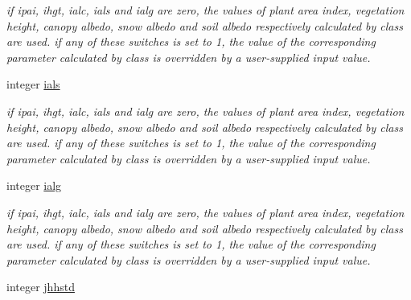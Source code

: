 \begin{DoxyCompactItemize}
\begin{DoxyCompactList}\small\item\em if ipai, ihgt, ialc, ials and ialg are zero, the values of plant area index, vegetation height, canopy albedo, snow albedo and soil albedo respectively calculated by class are used. if any of these switches is set to 1, the value of the corresponding parameter calculated by class is overridden by a user-\/supplied input value. \end{DoxyCompactList}\item 
\hypertarget{structctem__statevars_1_1ctem__switches_aff86913c530536a58810226dd8e6f61e}{}integer \hyperlink{structctem__statevars_1_1ctem__switches_aff86913c530536a58810226dd8e6f61e}{ials}\label{structctem__statevars_1_1ctem__switches_aff86913c530536a58810226dd8e6f61e}

\begin{DoxyCompactList}\small\item\em if ipai, ihgt, ialc, ials and ialg are zero, the values of plant area index, vegetation height, canopy albedo, snow albedo and soil albedo respectively calculated by class are used. if any of these switches is set to 1, the value of the corresponding parameter calculated by class is overridden by a user-\/supplied input value. \end{DoxyCompactList}\item 
\hypertarget{structctem__statevars_1_1ctem__switches_a85e5b15cebeef9dfacbba0ecca64380c}{}integer \hyperlink{structctem__statevars_1_1ctem__switches_a85e5b15cebeef9dfacbba0ecca64380c}{ialg}\label{structctem__statevars_1_1ctem__switches_a85e5b15cebeef9dfacbba0ecca64380c}

\begin{DoxyCompactList}\small\item\em if ipai, ihgt, ialc, ials and ialg are zero, the values of plant area index, vegetation height, canopy albedo, snow albedo and soil albedo respectively calculated by class are used. if any of these switches is set to 1, the value of the corresponding parameter calculated by class is overridden by a user-\/supplied input value. \end{DoxyCompactList}\item 
\hypertarget{structctem__statevars_1_1ctem__switches_afabdd2643de353e3f87584c134c43b2e}{}integer \hyperlink{structctem__statevars_1_1ctem__switches_afabdd2643de353e3f87584c134c43b2e}{jhhstd}\label{structctem__statevars_1_1ctem__switches_afabdd2643de353e3f87584c134c43b2e}


\end{DoxyCompactItemize}
